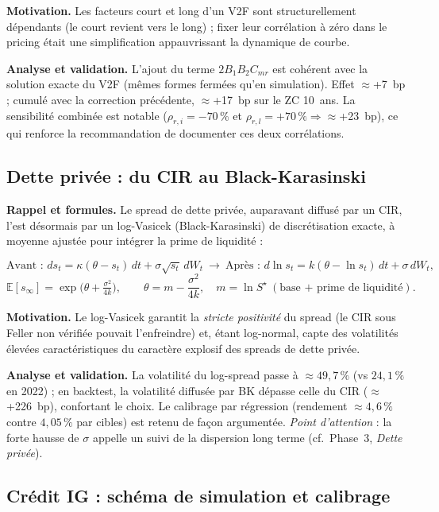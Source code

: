 \documentclass[11pt,a4paper]{article}
\begin{document}
\textbf{Motivation.} Les facteurs court et long d'un V2F sont structurellement dépendants (le court revient vers le long) ; fixer leur corrélation à zéro dans le pricing était une simplification appauvrissant la dynamique de courbe.

\textbf{Analyse et validation.} L'ajout du terme $2B_1B_2 C_{mr}$ est cohérent avec la solution exacte du V2F (mêmes formes fermées qu'en simulation). Effet $\approx$+7~bp ; cumulé avec la correction précédente, $\approx$+17~bp sur le ZC 10~ans. La sensibilité combinée est notable ($\rho_{r,i}=-70\,\%$ et $\rho_{r,l}=+70\,\%\Rightarrow\approx$+23~bp), ce qui renforce la recommandation de documenter ces deux corrélations.

\subsection{Dette privée : du CIR au Black-Karasinski}

\textbf{Rappel et formules.} Le spread de dette privée, auparavant diffusé par un CIR, l'est désormais par un log-Vasicek (Black-Karasinski) de discrétisation exacte, à moyenne ajustée pour intégrer la prime de liquidité :
\begin{definitionbox}
\[
\text{Avant : } ds_t=\kappa(\theta-s_t)\,dt+\sigma\sqrt{s_t}\,dW_t
\ \longrightarrow\
\text{Après : } d\ln s_t=k(\theta-\ln s_t)\,dt+\sigma\,dW_t ,
\]
\[
\mathbb E[s_\infty]=\exp\!\Big(\theta+\tfrac{\sigma^2}{4k}\Big),\qquad \theta=m-\frac{\sigma^2}{4k},\quad m=\ln S^\star \ (\text{base + prime de liquidité}).
\]
\end{definitionbox}

\textbf{Motivation.} Le log-Vasicek garantit la \emph{stricte positivité} du spread (le CIR sous Feller non vérifiée pouvait l'enfreindre) et, étant log-normal, capte des volatilités élevées caractéristiques du caractère explosif des spreads de dette privée.

\textbf{Analyse et validation.} La volatilité du log-spread passe à $\approx49{,}7\,\%$ (vs $24{,}1\,\%$ en 2022) ; en backtest, la volatilité diffusée par BK dépasse celle du CIR ($\approx$+226~bp), confortant le choix. Le calibrage par régression (rendement $\approx4{,}6\,\%$ contre $4{,}05\,\%$ par cibles) est retenu de façon argumentée. \emph{Point d'attention} : la forte hausse de $\sigma$ appelle un suivi de la dispersion long terme (cf.\ Phase~3, \emph{Dette privée}).

\subsection{Crédit IG : schéma de simulation et calibrage}
\end{document}
